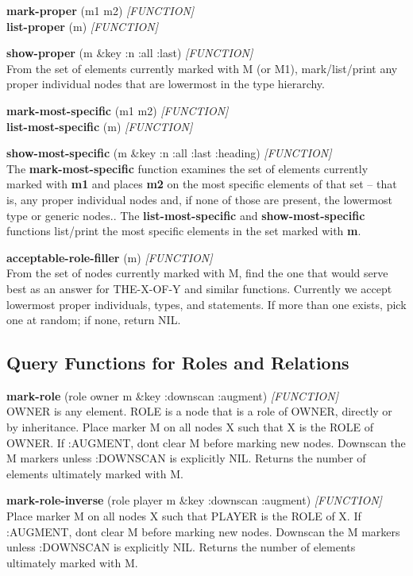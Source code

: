 \documentclass[titlepage,twoside,openright,11pt]{article}
\begin{document}
\textbf{mark-proper} (m1 m2) \emph{{[}FUNCTION{]}\\
}\textbf{list-proper} (m) \emph{{[}FUNCTION{]}}

\textbf{show-proper} (m \&key :n :all :last) \emph{{[}FUNCTION{]}}\\
From the set of elements currently marked with M (or M1),
mark/list/print any proper individual nodes that are lowermost in the
type hierarchy.

\textbf{mark-most-specific} (m1 m2) \emph{{[}FUNCTION{]}}\\
\textbf{list-most-specific} (m) \emph{{[}FUNCTION{]}}

\textbf{show-most-specific} (m \&key :n :all :last :heading)
\emph{{[}FUNCTION{]}}\\
The \textbf{mark-most-specific} function examines the set of elements
currently marked with \textbf{m1} and places \textbf{m2} on the most
specific elements of that set -- that is, any proper individual nodes
and, if none of those are present, the lowermost type or generic nodes..
The \textbf{list-most-specific} and \textbf{show-most-specific}
functions list/print the most specific elements in the set marked with
\textbf{m}.

\textbf{acceptable-role-filler} (m) \emph{{[}FUNCTION{]}}\\
From the set of nodes currently marked with M, find the one that would
serve best as an answer for THE-X-OF-Y and similar functions. Currently
we accept lowermost proper individuals, types, and statements. If more
than one exists, pick one at random; if none, return NIL.

\subsection{Query Functions for Roles and
Relations}\label{query-functions-for-roles-and-relations}

\textbf{mark-role} (role owner m \&key :downscan :augment)
\emph{{[}FUNCTION{]}}\\
OWNER is any element. ROLE is a node that is a role of OWNER, directly
or by inheritance. Place marker M on all nodes X such that
\textquotesingle X is the ROLE of OWNER\textquotesingle. If :AUGMENT,
don\textquotesingle t clear M before marking new nodes. Downscan the M
markers unless :DOWNSCAN is explicitly NIL. Returns the number of
elements ultimately marked with M.

\textbf{mark-role-inverse} (role player m \&key :downscan :augment)
\emph{{[}FUNCTION{]}}\\
Place marker M on all nodes X such that \textquotesingle PLAYER is the
ROLE of X\textquotesingle. If :AUGMENT, don\textquotesingle t clear M
before marking new nodes. Downscan the M markers unless :DOWNSCAN is
explicitly NIL. Returns the number of elements ultimately marked with M.
\end{document}

